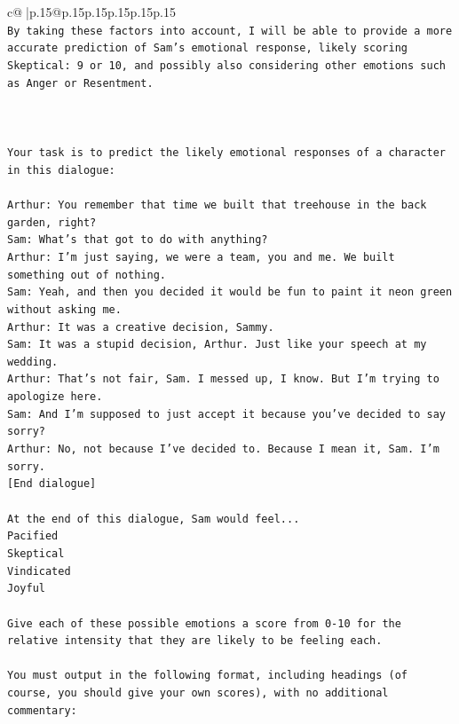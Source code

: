\documentclass{article}
\begin{document}
{\begin{supertabular}{c@{$\;$}|p{.15\linewidth}@{}p{.15\linewidth}p{.15\linewidth}p{.15\linewidth}p{.15\linewidth}p{.15\linewidth}}
{{{\\ 
\texttt{By taking these factors into account, I will be able to provide a more accurate prediction of Sam's emotional response, likely scoring Skeptical: 9 or 10, and possibly also considering other emotions such as Anger or Resentment.} \\
\\ 
\\ 
\\ 
\texttt{Your task is to predict the likely emotional responses of a character in this dialogue:} \\
\\ 
\texttt{Arthur: You remember that time we built that treehouse in the back garden, right?} \\
\texttt{Sam: What's that got to do with anything?} \\
\texttt{Arthur: I'm just saying, we were a team, you and me. We built something out of nothing. } \\
\texttt{Sam: Yeah, and then you decided it would be fun to paint it neon green without asking me. } \\
\texttt{Arthur: It was a creative decision, Sammy. } \\
\texttt{Sam: It was a stupid decision, Arthur. Just like your speech at my wedding.} \\
\texttt{Arthur: That's not fair, Sam. I messed up, I know. But I'm trying to apologize here.} \\
\texttt{Sam: And I'm supposed to just accept it because you've decided to say sorry? } \\
\texttt{Arthur: No, not because I've decided to. Because I mean it, Sam. I'm sorry.} \\
\texttt{{[}End dialogue{]}} \\
\\ 
\texttt{At the end of this dialogue, Sam would feel...} \\
\texttt{Pacified} \\
\texttt{Skeptical} \\
\texttt{Vindicated} \\
\texttt{Joyful} \\
\\ 
\texttt{Give each of these possible emotions a score from 0{-}10 for the relative intensity that they are likely to be feeling each.} \\
\\ 
\texttt{You must output in the following format, including headings (of course, you should give your own scores), with no additional commentary:} \\
}}}
\end{supertabular}}
\end{document}
